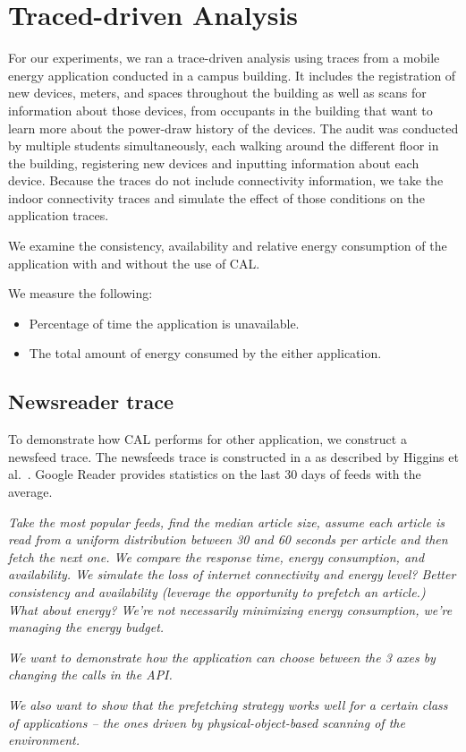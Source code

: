 \section{Traced-driven Analysis}
For our experiments, we ran a trace-driven analysis using traces from a mobile energy application conducted
in a campus building.  It includes the registration of new devices, meters, and spaces throughout the building
as well as scans for information about those devices, from occupants in the building that want to learn more
about the power-draw history of the devices.  The audit was conducted by multiple students simultaneously, each
walking around the different floor in the building, registering new devices and inputting information about
each device.  Because the traces do not include connectivity information, we 
take the indoor connectivity traces and simulate the effect of those conditions on the application traces.

We examine the consistency, availability and relative energy consumption of the application with and without
the use of CAL.

We measure the following:

\begin{itemize}
\item Percentage of time the application is unavailable.
\item The total amount of energy consumed by the either application. 
	\begin{itemize}

	\end{itemize}
\end{itemize}

\subsection{Newsreader trace}
To demonstrate how CAL performs for other application, we construct a newsfeed trace.  The newsfeeds trace is constructed in a
as described by Higgins et al.~\cite{imp_mobisys2012}.  Google Reader provides statistics on the last 30
days of feeds with the average.

\emph{Take the most popular feeds, find the median article size, assume each article is read from a uniform distribution between
30 and 60 seconds per article and then fetch the next one.  We compare the response time, energy consumption, and availability.
We simulate the loss of internet connectivity and energy level?  Better consistency and availability (leverage the opportunity 
to prefetch an article.)  What about energy?  We're not necessarily minimizing energy consumption, we're managing the energy budget.}

\emph{We want to demonstrate how the application can choose between the 3 axes by changing the calls in the API.  }

\emph{We also want to show that the prefetching strategy works well for a certain class of applications -- the ones driven by physical-object-based
scanning of the environment.}